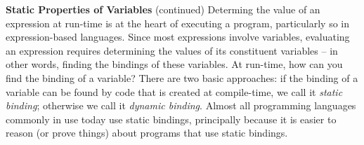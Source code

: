 \begin{minipage}[t]{\sw}
\slidenumber
\LARGE
{\bf Static Properties of Variables} (continued)\exx
Determing the value of an expression at run-time is at the heart
of executing a program, particularly so in expression-based languages.
Since most expressions involve variables,
evaluating an expression requires determining the values
of its constituent variables --
in other words, finding the bindings of these variables.\exx
At run-time, how can you find the binding of a variable?
There are two basic approaches:
if the binding of a variable can be found
by code that is created at compile-time,
we call it {\em static binding};
otherwise we call it {\em dynamic binding}.
Almost all programming languages commonly in use today
use static bindings,
principally because it is easier
to reason (or prove things) about programs that use static bindings.

\end{minipage}
\clearpage
